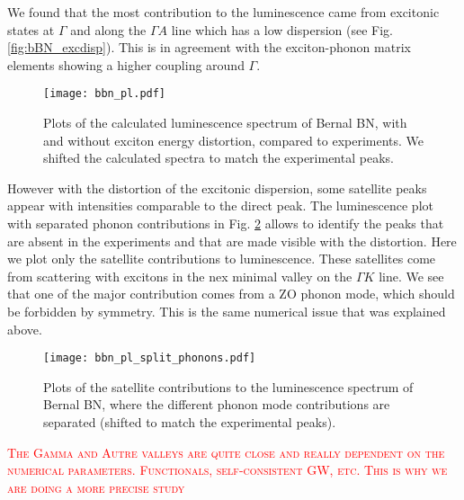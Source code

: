 We found that the most contribution to the luminescence came from excitonic states at $\Gamma$ and along the $\Gamma A$ line which has a low dispersion (see Fig. \ref{fig:bBN_excdisp}). This is in agreement with the exciton-phonon matrix elements showing a higher coupling around $\Gamma$.
\begin{figure}[h!b]
	\vspace{0.2cm}
	\setcapindent{2em}
	\centering
	\texttt{[image: bbn\_pl.pdf]}
	\caption{Plots of the calculated luminescence spectrum of Bernal BN, with and without exciton energy distortion, compared to experiments. We shifted the calculated spectra to match the experimental peaks.} %
    \label{fig:bBN_PL}
\end{figure}
However with the distortion of the excitonic dispersion, some satellite peaks appear with intensities comparable to the direct peak. The luminescence plot with separated phonon contributions in Fig. \ref{fig:bBN_PL_split_phonons} allows to identify the peaks that are absent in the experiments and that are made visible with the distortion. Here we plot only the satellite contributions to luminescence. These satellites come from scattering with excitons in the nex minimal valley on the $\Gamma K$ line. We see that one of the major contribution comes from a ZO phonon mode, which should be forbidden by symmetry. This is the same numerical issue that was explained above.
\begin{figure}[h!b]
	\vspace{0.2cm}
	\setcapindent{2em}
	\centering
	\texttt{[image: bbn\_pl\_split\_phonons.pdf]}
	\caption{Plots of the satellite contributions to the luminescence spectrum of Bernal BN, where the different phonon mode contributions are separated (shifted to match the experimental peaks).} %
    \label{fig:bBN_PL_split_phonons}
\end{figure}
\textcolor{red}{\textsc{The Gamma and Autre valleys are quite close and really dependent on the numerical parameters. Functionals, self-consistent GW, etc. This is why we are doing a more precise study}}


